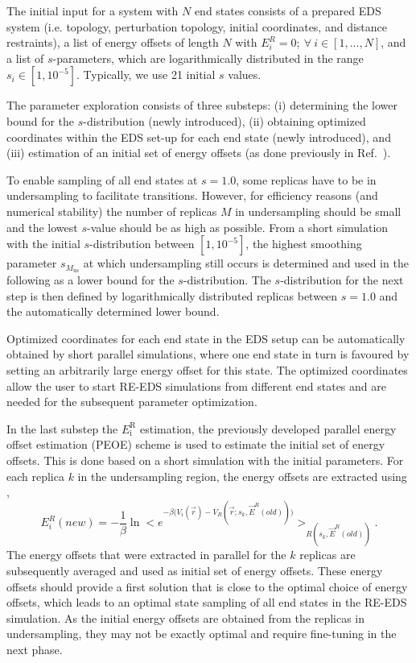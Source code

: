 %
The initial input for a system with $N$ end states consists of a prepared EDS system (i.e. topology,  perturbation topology, initial coordinates, and distance restraints), a list of energy offsets of length $N$ with $E_i^R = 0; ~ \forall ~ i \in [1,...,N]$, and a list of $s$-parameters, which are logarithmically distributed in the range $s_i \in [1, 10^{-5}]$. Typically, we use 21 initial $s$ values. 

The parameter exploration consists of three substeps: (i) determining the lower bound for the $s$-distribution (newly introduced), (ii) obtaining optimized coordinates within the EDS set-up for each end state (newly introduced), and (iii) estimation of an initial set of energy offsets (as done previously in Ref.~\cite{Sidler2016}).

To enable sampling of all end states at $s=1.0$, some replicas have to be in undersampling to facilitate transitions. However, for efficiency reasons (and numerical stability) the number of replicas $M$ in undersampling should be small and the lowest $s$-value should be as high as possible. From a short simulation with the initial $s$-distribution between $[1, 10^{-5}]$, the highest smoothing parameter $s_{M_\mathrm{us}}$ at which undersampling still occurs is determined and used in the following as a lower bound for the $s$-distribution. The $s$-distribution for the next step is then defined by logarithmically distributed replicas between $s=1.0$ and the automatically determined lower bound.

Optimized coordinates for each end state in the EDS setup can be automatically obtained by short parallel simulations, where one end state in turn is favoured by setting an arbitrarily large energy offset for this state. 
The optimized coordinates allow the user to start RE-EDS simulations from different end states and are needed for the subsequent parameter optimization. 

In the last substep the $E_{\text{i}}^{\text{R}}$ estimation, the previously developed parallel energy offset estimation (PEOE) \cite{Sidler2016} scheme is used to estimate the initial set of energy offsets. This is done based on a short simulation with the initial parameters. For each replica $k$ in the undersampling region, the energy offsets are extracted using \cite{Sidler2016},
\begin{equation}
    E_{i}^{R}(new)=-\frac{1}{\beta}\ln \Big < e^{-\beta \big(V_i(\vec{r})-V_R(\vec{r}; s_{k},\vec{E}^{R}(old))\big)}\Big>_{R(s_{k},\vec{E}^{R}(old))} .
    \label{eq: EoffEstimator}
\end{equation}
The energy offsets that were extracted in parallel for the $k$ replicas are subsequently averaged and used as initial set of energy offsets. These energy offsets should provide a first solution that is close to the optimal choice of energy offsets, which leads to an optimal state sampling of all end states in the RE-EDS simulation. As the initial energy offsets are obtained from the replicas in undersampling, they may not be exactly optimal and require fine-tuning in the next phase. 


